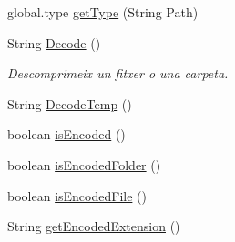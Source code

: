 \begin{DoxyCompactItemize}
global.\+type \hyperlink{classdomini_1_1folders_1_1Ctrl__FolderFile_a9e2ef751bdcb99083831c6b4e4761169}{get\+Type} (String Path)
\item 
String \hyperlink{classdomini_1_1folders_1_1Ctrl__FolderFile_a5d28ac7f5223ecd40a242148e86447c1}{Decode} ()
\begin{DoxyCompactList}\small\item\em Descomprimeix un fitxer o una carpeta. \end{DoxyCompactList}\item 
String \hyperlink{classdomini_1_1folders_1_1Ctrl__FolderFile_afa0f6968113855feccccfdbacc00444e}{Decode\+Temp} ()
\item 
boolean \hyperlink{classdomini_1_1folders_1_1Ctrl__FolderFile_a47a7ad955f1c579384dfba08bc7be8e0}{is\+Encoded} ()
\item 
boolean \hyperlink{classdomini_1_1folders_1_1Ctrl__FolderFile_a095e6037e5cdf9a43806a308ca028791}{is\+Encoded\+Folder} ()
\item 
boolean \hyperlink{classdomini_1_1folders_1_1Ctrl__FolderFile_a3198690e1ecc46e00431f35d87080d79}{is\+Encoded\+File} ()
\item 
String \hyperlink{classdomini_1_1folders_1_1Ctrl__FolderFile_a61d9dfde0932787a2398af3ddf99c34b}{get\+Encoded\+Extension} ()
\end{DoxyCompactItemize}
